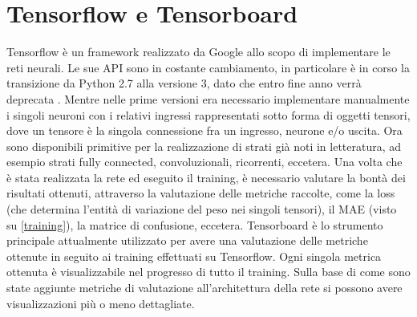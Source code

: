 \section{Tensorflow e Tensorboard}\label{tensorboard}
Tensorflow è un framework realizzato da Google allo scopo di implementare le reti neurali. Le sue API sono in costante cambiamento, in particolare è in corso la transizione da Python 2.7 alla versione 3, dato che entro fine anno verrà deprecata \cite{python2sunsetting}. Mentre nelle prime versioni era necessario implementare manualmente i singoli neuroni con i relativi ingressi rappresentati sotto forma di oggetti tensori, dove un tensore è la singola connessione fra un ingresso, neurone e/o uscita. Ora sono disponibili primitive per la realizzazione di strati già noti in letteratura, ad esempio strati fully connected, convoluzionali, ricorrenti, eccetera. Una volta che è stata realizzata la rete ed eseguito il training, è necessario valutare la bontà dei risultati ottenuti, attraverso la valutazione delle metriche raccolte, come la loss (che determina l'entità di variazione del peso nei singoli tensori), il MAE (visto su \ref{training}), la matrice di confusione, eccetera.
Tensorboard è lo strumento principale attualmente utilizzato per avere una valutazione delle metriche ottenute in seguito ai training effettuati su Tensorflow. Ogni singola metrica ottenuta è visualizzabile nel progresso di tutto il training. Sulla base di come sono state aggiunte metriche di valutazione all'architettura della rete si possono avere visualizzazioni più o meno dettagliate.